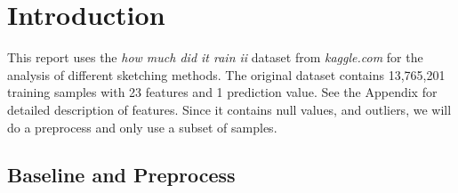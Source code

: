 \section{Introduction}
\label{sec:intro}

This report uses the \emph{how much did it rain ii} \cite{rain, Lakshmanan16}
dataset from \emph{kaggle.com} for the analysis of different sketching methods.
The original dataset contains 13,765,201 training samples
with 23 features and 1 prediction value.
See the Appendix for detailed description of features.
Since it contains null values, and outliers,
we will do a preprocess and only use a subset of samples.

\subsection{Baseline and Preprocess}
